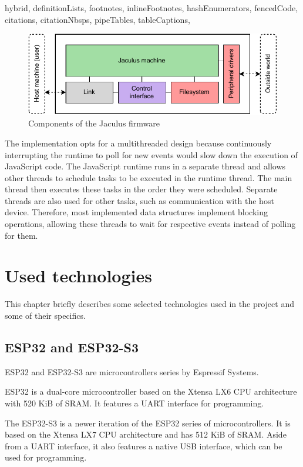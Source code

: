 \begin{markdown*}{%
  hybrid,
  definitionLists,
  footnotes,
  inlineFootnotes,
  hashEnumerators,
  fencedCode,
  citations,
  citationNbsps,
  pipeTables,
  tableCaptions,
}
\begin{figure}[!ht]
  \centering
  \includegraphics[width=\textwidth]{img/jaculus-design}
  \caption{Components of the Jaculus firmware}
  \label{fig:jaculus-design}
\end{figure}

The implementation opts for a multithreaded design because continuously interrupting the runtime to poll for new events would slow down the execution of JavaScript code. The JavaScript runtime runs in a separate thread and allows other threads to schedule tasks to be executed in the runtime thread. The main thread then executes these tasks in the order they were scheduled. Separate threads are also used for other tasks, such as communication with the host device. Therefore, most implemented data structures implement blocking operations, allowing these threads to wait for respective events instead of polling for them.


\chapter{Used technologies}

This chapter briefly describes some selected technologies used in the project and some of their specifics.

\section{ESP32 and ESP32-S3}

ESP32\cite{esp32} and ESP32-S3\cite{esp32-s3} are microcontrollers series by Espressif Systems.

ESP32 is a dual-core microcontroller based on the Xtensa LX6 CPU architecture with 520 KiB of SRAM. It features a UART interface for programming.

The ESP32-S3 is a newer iteration of the ESP32 series of microcontrollers. It is based on the Xtensa LX7 CPU architecture and has 512 KiB of SRAM. Aside from a UART interface, it also features a native USB interface, which can be used for programming.


\end{markdown*}

